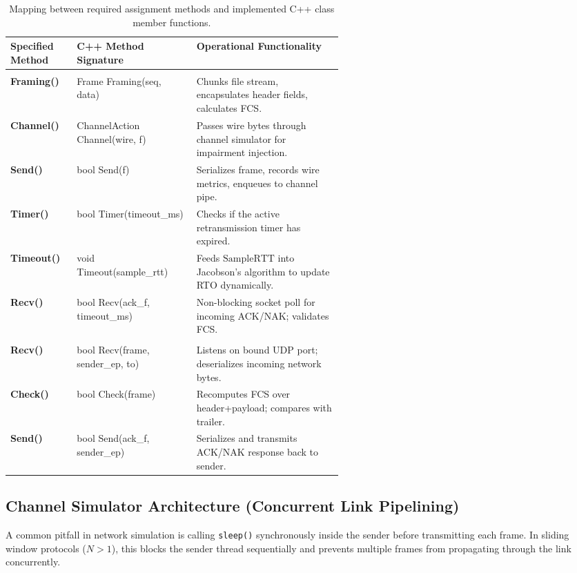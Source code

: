 \documentclass[11pt,a4paper]{article}
\begin{document}
\begin{table}[H]
\centering
\small
\begin{tabularx}{\linewidth}{@{}>{\ttfamily\bfseries}p{0.20\linewidth} >{\ttfamily\footnotesize}p{0.36\linewidth} X@{}}
\toprule
\textrm{\textbf{Specified Method}} & \textrm{\textbf{C++ Method Signature}} & \textbf{Operational Functionality} \\
\midrule
\multicolumn{3}{@{}l}{\textbf{Sender Program Methods}} \\
Framing() & Frame Framing(seq, data) & Chunks file stream, encapsulates header fields, calculates FCS. \\
Channel() & ChannelAction Channel(wire, f) & Passes wire bytes through channel simulator for impairment injection. \\
Send() & bool Send(f) & Serializes frame, records wire metrics, enqueues to channel pipe. \\
Timer() & bool Timer(timeout\_ms) & Checks if the active retransmission timer has expired. \\
Timeout() & void Timeout(sample\_rtt) & Feeds $\text{SampleRTT}$ into Jacobson's algorithm to update RTO dynamically. \\
Recv() & bool Recv(ack\_f, timeout\_ms) & Non-blocking socket poll for incoming ACK/NAK; validates FCS. \\
\midrule
\multicolumn{3}{@{}l}{\textbf{Receiver Program Methods}} \\
Recv() & bool Recv(frame, sender\_ep, to) & Listens on bound UDP port; deserializes incoming network bytes. \\
Check() & bool Check(frame) & Recomputes FCS over header+payload; compares with trailer. \\
Send() & bool Send(ack\_f, sender\_ep) & Serializes and transmits ACK/NAK response back to sender. \\
\bottomrule
\end{tabularx}
\caption{Mapping between required assignment methods and implemented C++ class member functions.}
\label{tab:methodmapping}
\end{table}

\subsection{Channel Simulator Architecture (Concurrent Link Pipelining)}
A common pitfall in network simulation is calling \texttt{sleep()} synchronously inside the sender before transmitting each frame. In sliding window protocols ($N > 1$), this blocks the sender thread sequentially and prevents multiple frames from propagating through the link concurrently.
\end{document}
